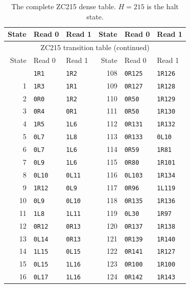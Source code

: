 \footnotesize
\renewcommand{\arraystretch}{0.96}
\begin{longtable}{rll@{\hspace{18mm}}rll}
\caption{The complete ZC215 dense table. $H=215$ is the halt state.}\label{tab:machine}\\
\toprule State & Read 0 & Read 1 & State & Read 0 & Read 1 \\ \midrule
\endfirsthead
\multicolumn{6}{c}{\small ZC215 transition table (continued)}\\
\toprule State & Read 0 & Read 1 & State & Read 0 & Read 1 \\ \midrule
\endhead
\bottomrule\endfoot
0 & \texttt{1R1} & \texttt{1R2} & 108 & \texttt{0R125} & \texttt{1R126} \\
1 & \texttt{1R3} & \texttt{1R1} & 109 & \texttt{0R127} & \texttt{1R128} \\
2 & \texttt{0R0} & \texttt{1R2} & 110 & \texttt{0R50} & \texttt{1R129} \\
3 & \texttt{0R4} & \texttt{0R1} & 111 & \texttt{0R50} & \texttt{1R130} \\
4 & \texttt{1R5} & \texttt{1L6} & 112 & \texttt{0R131} & \texttt{1R132} \\
5 & \texttt{0L7} & \texttt{1L8} & 113 & \texttt{0R133} & \texttt{0L10} \\
6 & \texttt{0L7} & \texttt{1L6} & 114 & \texttt{0R59} & \texttt{1R81} \\
7 & \texttt{0L9} & \texttt{1L6} & 115 & \texttt{0R80} & \texttt{1R101} \\
8 & \texttt{0L10} & \texttt{0L11} & 116 & \texttt{0L103} & \texttt{1R134} \\
9 & \texttt{1R12} & \texttt{0L9} & 117 & \texttt{0R96} & \texttt{1L119} \\
10 & \texttt{0L9} & \texttt{0L10} & 118 & \texttt{0R135} & \texttt{1R136} \\
11 & \texttt{1L8} & \texttt{1L11} & 119 & \texttt{0L30} & \texttt{1R97} \\
12 & \texttt{0R12} & \texttt{0R13} & 120 & \texttt{0R137} & \texttt{1R138} \\
13 & \texttt{0L14} & \texttt{0R13} & 121 & \texttt{0R139} & \texttt{1R140} \\
14 & \texttt{1L15} & \texttt{0L15} & 122 & \texttt{0R141} & \texttt{1R127} \\
15 & \texttt{0L15} & \texttt{1L16} & 123 & \texttt{0R100} & \texttt{1R100} \\
16 & \texttt{0L17} & \texttt{1L16} & 124 & \texttt{0R142} & \texttt{1R143} \\

\end{longtable}
